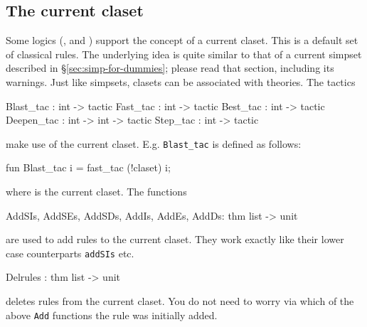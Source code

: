 \subsection{The current claset}
Some logics (\FOL, {\HOL} and \ZF) support the concept of a current
claset.  This is a default set of classical rules.  The
underlying idea is quite similar to that of a current simpset described in
\S\ref{sec:simp-for-dummies}; please read that section, including its
warnings.  Just like simpsets, clasets can be associated with theories.  The
tactics
\begin{ttbox}
Blast_tac    : int -> tactic
Fast_tac     : int -> tactic
Best_tac     : int -> tactic
Deepen_tac   : int -> int -> tactic
Step_tac     : int -> tactic
\end{ttbox}
%
make use of the current claset. E.g. {\tt Blast_tac} is defined as follows:
\begin{ttbox}
fun Blast_tac i = fast_tac (!claset) i;
\end{ttbox}
where  is the current claset.
The functions
\begin{ttbox}
AddSIs, AddSEs, AddSDs, AddIs, AddEs, AddDs: thm list -> unit
\end{ttbox}
  
  
are used to add rules to the current claset. They work exactly like their
lower case counterparts {\tt addSIs} etc.
\begin{ttbox}
Delrules : thm list -> unit
\end{ttbox}
deletes rules from the current claset. You do not need to worry via which of
the above {\tt Add} functions the rule was initially added.

